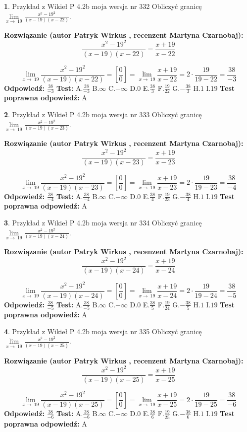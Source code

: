 \documentclass[12pt, a4paper]{article}
\theoremstyle{definition} %
\newtheorem{zad}{}
\newcommand{\zadStart}[1]{\begin{zad}#1\newline}
\newcommand{\zadStop}{\end{zad}}
\newcommand{\rozwStart}[2]{\noindent \textbf{Rozwiązanie (autor #1 , recenzent #2): }\newline}
\newcommand{\rozwStop}{\newline}
\newcommand{\odpStart}{\noindent \textbf{Odpowiedź:}\newline}
\newcommand{\odpStop}{\newline}
\newcommand{\testStart}{\noindent \textbf{Test:}\newline}
\newcommand{\testStop}{\newline}
\newcommand{\kluczStart}{\noindent \textbf{Test poprawna odpowiedź:}\newline}
\newcommand{\kluczStop}{\newline}
\begin{document}
\zadStart{Przykład z Wikieł P 4.2b moja wersja nr 332}
Obliczyć granicę $\lim\limits_{x\to\ 19}\frac{x^{2}-19^{2}}{(x-19)(x-22)}$.
\zadStop
\rozwStart{Patryk Wirkus}{Martyna Czarnobaj}
$$\frac{x^{2}-19^{2}}{(x-19)(x-22)}=\frac{x+19}{x-22}$$

$$\lim\limits_{x\to\ 19}\frac{x^{2}-19^{2}}{(x-19)(x-22)}=[\frac{0}{0}]=\lim\limits_{x\to\ 19}\frac{x+19}{x-22}=2 \cdot \frac{19}{19-22} = \frac{38}{-3}$$
\rozwStop
\odpStart
$\frac{38}{-3}$
\odpStop
\testStart
A.$\frac{38}{-3}$
B.$\infty$
C.$-\infty$
D.$0$
E.$\frac{38}{3}$
F.$\frac{19}{22}$
G.$-\frac{38}{3}$
H.$1$
I.$19$
\testStop
\kluczStart
A
\kluczStop



\zadStart{Przykład z Wikieł P 4.2b moja wersja nr 333}
Obliczyć granicę $\lim\limits_{x\to\ 19}\frac{x^{2}-19^{2}}{(x-19)(x-23)}$.
\zadStop
\rozwStart{Patryk Wirkus}{Martyna Czarnobaj}
$$\frac{x^{2}-19^{2}}{(x-19)(x-23)}=\frac{x+19}{x-23}$$

$$\lim\limits_{x\to\ 19}\frac{x^{2}-19^{2}}{(x-19)(x-23)}=[\frac{0}{0}]=\lim\limits_{x\to\ 19}\frac{x+19}{x-23}=2 \cdot \frac{19}{19-23} = \frac{38}{-4}$$
\rozwStop
\odpStart
$\frac{38}{-4}$
\odpStop
\testStart
A.$\frac{38}{-4}$
B.$\infty$
C.$-\infty$
D.$0$
E.$\frac{38}{4}$
F.$\frac{19}{23}$
G.$-\frac{38}{4}$
H.$1$
I.$19$
\testStop
\kluczStart
A
\kluczStop



\zadStart{Przykład z Wikieł P 4.2b moja wersja nr 334}
Obliczyć granicę $\lim\limits_{x\to\ 19}\frac{x^{2}-19^{2}}{(x-19)(x-24)}$.
\zadStop
\rozwStart{Patryk Wirkus}{Martyna Czarnobaj}
$$\frac{x^{2}-19^{2}}{(x-19)(x-24)}=\frac{x+19}{x-24}$$

$$\lim\limits_{x\to\ 19}\frac{x^{2}-19^{2}}{(x-19)(x-24)}=[\frac{0}{0}]=\lim\limits_{x\to\ 19}\frac{x+19}{x-24}=2 \cdot \frac{19}{19-24} = \frac{38}{-5}$$
\rozwStop
\odpStart
$\frac{38}{-5}$
\odpStop
\testStart
A.$\frac{38}{-5}$
B.$\infty$
C.$-\infty$
D.$0$
E.$\frac{38}{5}$
F.$\frac{19}{24}$
G.$-\frac{38}{5}$
H.$1$
I.$19$
\testStop
\kluczStart
A
\kluczStop



\zadStart{Przykład z Wikieł P 4.2b moja wersja nr 335}
Obliczyć granicę $\lim\limits_{x\to\ 19}\frac{x^{2}-19^{2}}{(x-19)(x-25)}$.
\zadStop
\rozwStart{Patryk Wirkus}{Martyna Czarnobaj}
$$\frac{x^{2}-19^{2}}{(x-19)(x-25)}=\frac{x+19}{x-25}$$

$$\lim\limits_{x\to\ 19}\frac{x^{2}-19^{2}}{(x-19)(x-25)}=[\frac{0}{0}]=\lim\limits_{x\to\ 19}\frac{x+19}{x-25}=2 \cdot \frac{19}{19-25} = \frac{38}{-6}$$
\rozwStop
\odpStart
$\frac{38}{-6}$
\odpStop
\testStart
A.$\frac{38}{-6}$
B.$\infty$
C.$-\infty$
D.$0$
E.$\frac{38}{6}$
F.$\frac{19}{25}$
G.$-\frac{38}{6}$
H.$1$
I.$19$
\testStop
\kluczStart
A
\kluczStop
\end{document}
